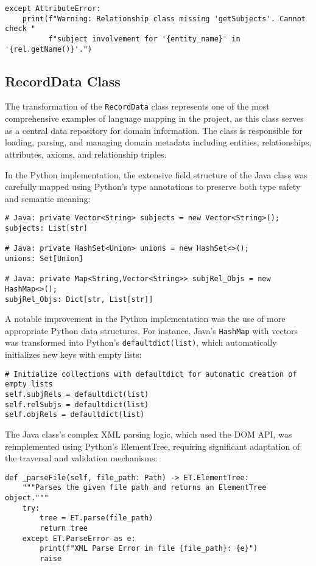 \documentclass[12pt,a4paper]{article}
\begin{document}
\begin{verbatim}
except AttributeError:
    print(f"Warning: Relationship class missing 'getSubjects'. Cannot check "
          f"subject involvement for '{entity_name}' in '{rel.getName()}'.")
\end{verbatim}

\subsection{RecordData Class}

The transformation of the \texttt{RecordData} class represents one of the most comprehensive examples of language mapping in the project, as this class serves as a central data repository for domain information. The class is responsible for loading, parsing, and managing domain metadata including entities, relationships, attributes, axioms, and relationship triples.

In the Python implementation, the extensive field structure of the Java class was carefully mapped using Python's type annotations to preserve both type safety and semantic meaning:

\begin{verbatim}
# Java: private Vector<String> subjects = new Vector<String>();
subjects: List[str]

# Java: private HashSet<Union> unions = new HashSet<>();
unions: Set[Union]

# Java: private Map<String,Vector<String>> subjRel_Objs = new HashMap<>();
subjRel_Objs: Dict[str, List[str]]
\end{verbatim}

A notable improvement in the Python implementation was the use of more appropriate Python data structures. For instance, Java's \texttt{HashMap} with vectors was transformed into Python's \texttt{defaultdict(list)}, which automatically initializes new keys with empty lists:

\begin{verbatim}
# Initialize collections with defaultdict for automatic creation of empty lists
self.subjRels = defaultdict(list)
self.relSubjs = defaultdict(list)
self.objRels = defaultdict(list)
\end{verbatim}

The Java class's complex XML parsing logic, which used the DOM API, was reimplemented using Python's ElementTree, requiring significant adaptation of the traversal and validation mechanisms:

\begin{verbatim}
def _parseFile(self, file_path: Path) -> ET.ElementTree:
    """Parses the given file path and returns an ElementTree object."""
    try:
        tree = ET.parse(file_path)
        return tree
    except ET.ParseError as e:
        print(f"XML Parse Error in file {file_path}: {e}")
        raise
\end{verbatim}
\end{document}
